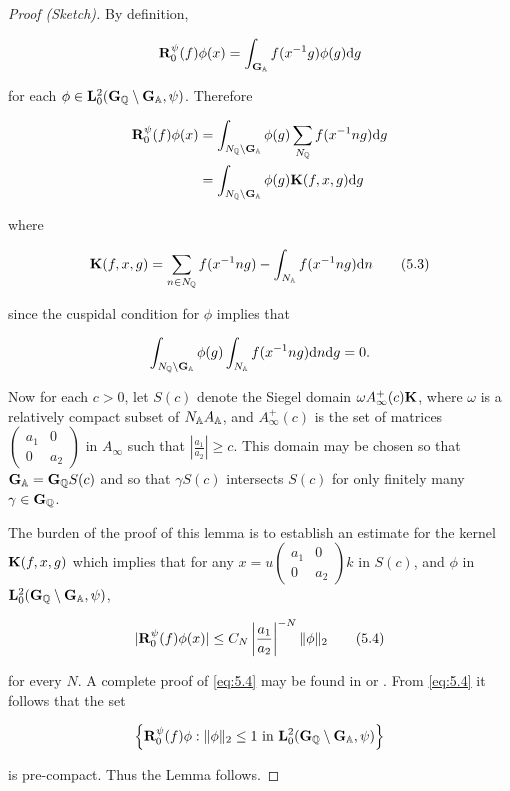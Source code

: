 \begin{proof}[Proof (Sketch)]

By definition,

\[
\mathbf{R}_0^{\psi}(f)\phi(x) = \int_{\mathbf{G}_{\mathbb{A}}} f(x^{-1}g)\phi(g) \mathrm{d} g
\]

for each $\phi \in \mathbf{L}_0^2(\mathbf{G}_{\mathbb{Q}} \setminus \mathbf{G}_{\mathbb{A}}, \psi)$. Therefore

\[
\begin{aligned}
\mathbf{R}_0^{\psi}(f)\phi(x) &= \int_{N_{\mathbb{Q}} \setminus \mathbf{G}_{\mathbb{A}}} \phi(g) \sum_{N_{\mathbb{Q}}} f(x^{-1}ng) \mathrm{d} g\\
&= \int_{N_{\mathbb{Q}} \setminus \mathbf{G}_{\mathbb{A}}} \phi(g) \mathbf{K}(f, x, g) \mathrm{d} g
\end{aligned}
\]

where

\begin{equation}\label{eq:5.3}
\mathbf{K}(f,x,g) = \sum_{n \in N_{\mathbb{Q}}} f(x^{-1}ng) - \int_{N_{\mathbb{A}}} f(x^{-1}ng) \mathrm{d} n\tag{5.3}
\end{equation}

since the cuspidal condition for $\phi$ implies that

\[
\int_{N_{\mathbb{Q}} \setminus \mathbf{G}_{\mathbb{A}}} \phi(g) \int_{N_{\mathbb{A}}} f(x^{-1}ng) \mathrm{d} n \mathrm{d} g = 0.
\]

Now for each $c > 0$, let $S(c)$ denote the Siegel domain $\omega A_{\infty}^{+}(c)\mathbf{K}$, where $\omega$ is a relatively compact subset of $N_{\mathbb{A}} A_{\mathbb{A}}$, and $A_{\infty}^{+}(c)$ is the set of matrices $\begin{pmatrix} a_1 & 0 \\ 0 & a_2 \end{pmatrix}$ in $A_{\infty}$ such that $\left|\frac{a_1}{a_2}\right| \geq c$. This domain may be chosen so that $\mathbf{G}_{\mathbb{A}} = \mathbf{G}_{\mathbb{Q}} S(c)$ and so that $\gamma S(c)$ intersects $S(c)$ for only finitely many $\gamma \in \mathbf{G}_{\mathbb{Q}}$.

The burden of the proof of this lemma is to establish an estimate for the kernel $\mathbf{K}(f, x, g)$ which implies that for any $x = u \begin{pmatrix} a_1 & 0 \\ 0 & a_2 \end{pmatrix} k$ in $S(c)$, and $\phi$ in $\mathbf{L}_0^2(\mathbf{G}_{\mathbb{Q}} \setminus \mathbf{G}_{\mathbb{A}}, \psi)$,

\begin{equation}\label{eq:5.4}
|\mathbf{R}_0^{\psi}(f)\phi(x)| \leq C_N \left|\frac{a_1}{a_2}\right|^{-N} \|\phi\|_2\tag{5.4}
\end{equation}

for every $N$. A complete proof of \eqref{eq:5.4} may be found in \cite{Langlands} or \cite{Godement2}. From \eqref{eq:5.4} it follows that the set

\[
\left\{\mathbf{R}_0^{\psi}(f)\phi : \|\phi\|_2 \leq 1 \text{ in } \mathbf{L}_0^2(\mathbf{G}_{\mathbb{Q}} \setminus \mathbf{G}_{\mathbb{A}}, \psi)\right\}
\]

is pre-compact. Thus the Lemma follows.

\end{proof}

